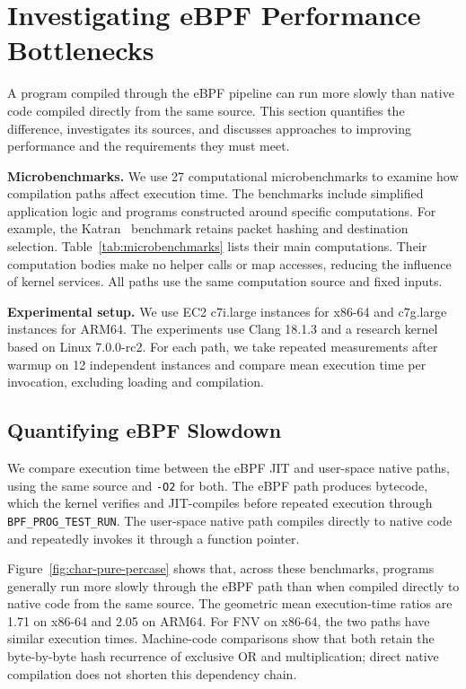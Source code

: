 \section{Investigating eBPF Performance Bottlenecks}
\label{sec:characterization}

A program compiled through the eBPF pipeline can run more slowly than native code compiled directly from the same source. This section quantifies the difference, investigates its sources, and discusses approaches to improving performance and the requirements they must meet.

\noindent\textbf{Microbenchmarks.}
We use 27 computational microbenchmarks to examine how compilation paths affect execution time. The benchmarks include simplified application logic and programs constructed around specific computations. For example, the Katran~\cite{katran} benchmark retains packet hashing and destination selection. Table~\ref{tab:microbenchmarks} lists their main computations. Their computation bodies make no helper calls or map accesses, reducing the influence of kernel services. All paths use the same computation source and fixed inputs.



\noindent\textbf{Experimental setup.}
We use EC2 c7i.large instances for x86-64 and c7g.large instances for ARM64. The experiments use Clang 18.1.3 and a research kernel based on Linux 7.0.0-rc2. For each path, we take repeated measurements after warmup on 12 independent instances and compare mean execution time per invocation, excluding loading and compilation.

\subsection{Quantifying eBPF Slowdown}
\label{subsec:char-slowdown}

We compare execution time between the eBPF JIT and user-space native paths, using the same source and \texttt{-O2} for both. The eBPF path produces bytecode, which the kernel verifies and JIT-compiles before repeated execution through \texttt{BPF\_PROG\_TEST\_RUN}. The user-space native path compiles directly to native code and repeatedly invokes it through a function pointer.



Figure~\ref{fig:char-pure-percase} shows that, across these benchmarks, programs generally run more slowly through the eBPF path than when compiled directly to native code from the same source. The geometric mean execution-time ratios are 1.71 on x86-64 and 2.05 on ARM64. For FNV on x86-64, the two paths have similar execution times. Machine-code comparisons show that both retain the byte-by-byte hash recurrence of exclusive OR and multiplication; direct native compilation does not shorten this dependency chain.

